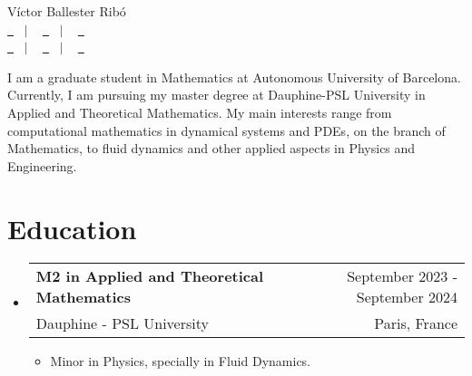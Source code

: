 \documentclass[a4paper,11pt]{article}
\makeatletter
\newcommand{\resumeQuadHeading}[4]{
  \item
  \begin{tabular*}{0.96\textwidth}[t]{l@{\extracolsep{\fill}}r}
    \textbf{#1} & \small #2 \\
    \small#3 & \small #4 \\
  \end{tabular*}
}
\newcommand{\resumeHeadingListStart}{
  \begin{itemize}[leftmargin=0.15in, label={}]
}
\newcommand{\resumeHeadingListEnd}{\end{itemize}}
\makeatother
\begin{document}
\begin{center}
  {\Huge Víctor Ballester Ribó\vspace{2pt}} \\[1.25pc]
  \href{https://victorballester7.github.io}{\faLink \ } \ $|$ \ %
  \href{https://www.linkedin.com/in/victorballester7}{\faLinkedinSquare \ } \ $|$ \ %
  \href{https://www.github.com/victorballester7}{\faGithub \ } \\[0.1pc] %
  \href{tel:+33765750262}{\faPhone \ } \ $|$ \ %
  \href{mailto:victor.ballester-ribo@dauphine.eu}{\faEnvelope \ } \ $|$ \ %
  \href{https://maps.app.goo.gl/mBsBKy4iHiBFkVGz5}{\faHome \ } \\[1.5pc] %
\end{center}

\begin{justify}
  I am a graduate student in Mathematics at Autonomous University of Bar\-ce\-lo\-na. Currently, I am pursuing my master degree at Dauphine-PSL University in Applied and Theoretical Mathematics. My main interests range from computational mathematics in dynamical systems and PDEs, on the branch of Math\-e\-mat\-ics, to fluid dynamics and other applied aspects in Physics and Engineering.
\end{justify}



\section{Education}
\resumeHeadingListStart{}
\resumeQuadHeading{M2 in Applied and Theoretical Mathematics}{September 2023 - September 2024}
{Dauphine - PSL University}{Paris, France}
\begin{itemize}[leftmargin=3em, itemsep=0.1em, topsep=2pt]
  \item \small Minor in Physics, specially in Fluid Dynamics.
\end{itemize}
\resumeHeadingListEnd{}
\end{document}
